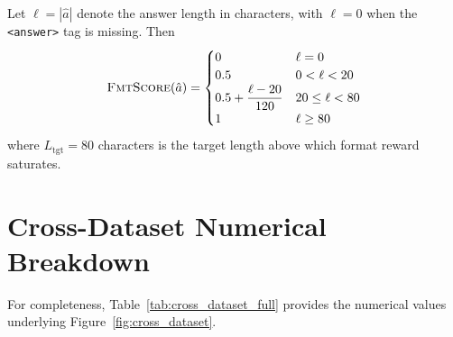 \documentclass[11pt]{article}
\begin{document}
Let $\ell = |\hat{a}|$ denote the answer length in 
characters, with $\ell = 0$ when the 
\texttt{<answer>} tag is missing. Then
\begin{equation}
\textsc{FmtScore}(\hat{a}) = \begin{cases}
0 & \ell = 0 \\
0.5 & 0 < \ell < 20 \\
0.5 + \dfrac{\ell - 20}{120} & 20 \leq \ell < 80 \\
1 & \ell \geq 80
\end{cases}
\label{eq:fmtscore}
\end{equation}
where $L_{\text{tgt}} = 80$ characters is the target 
length above which format reward saturates.

\section{Cross-Dataset Numerical Breakdown}
\label{app:cross_dataset_numbers}
For completeness, Table~\ref{tab:cross_dataset_full} 
provides the numerical values underlying 
Figure~\ref{fig:cross_dataset}.
\end{document}
